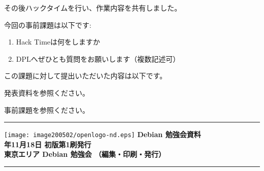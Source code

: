 \documentclass[mingoth,a4paper]{jsarticle}
\newcommand{\debmtgyear}{2017}
\newcommand{\debmtgmonth}{11}
\newcommand{\debmtgdate}{18}
\begin{document}
その後ハックタイムを行い、作業内容を共有しました。



今回の事前課題は以下です:
\begin{enumerate}
\item Hack Timeは何をしますか
\item DPLへぜひとも質問をお願いします（複数記述可）
\end{enumerate}
この課題に対して提出いただいた内容は以下です。
\begin{multicols}{2}
{\small

}
\end{multicols}

%
%
%
%




発表資料を参照ください。


事前課題を参照ください。

%
\mbox{}\newpage

\vspace*{15cm}
\hrule
\vspace{2mm}
\texttt{[image: image200502/openlogo-nd.eps]}
\noindent \Large \bf Debian 勉強会資料\\
\noindent \normalfont \debmtgyear{}年\debmtgmonth{}月\debmtgdate{}日 \hspace{5mm}  初版第1刷発行\\
\noindent \normalfont 東京エリア Debian 勉強会 （編集・印刷・発行）\\
\hrule
\end{document}
